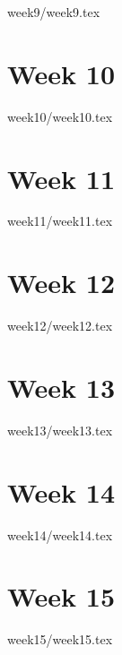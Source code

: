 \documentclass[a4paper]{article}
\begin{document}
{week9/week9.tex}

\section{Week 10}

{week10/week10.tex}

\section{Week 11}

{week11/week11.tex}

\section{Week 12}

{week12/week12.tex}

\section{Week 13}

{week13/week13.tex}

\section{Week 14}

{week14/week14.tex}

\section{Week 15}

{week15/week15.tex}
\end{document}
